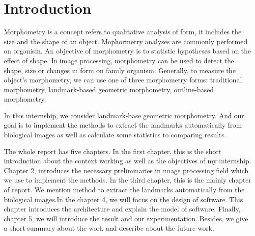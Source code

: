\chapter*{Introduction}
Morphometry is a concept refers to qualitative analysis of form, it includes the size and the shape of an object. Mophormetry analyses are commonly performed on organism. An objective of morphometry is to statistic hypotheses based on the effect of shape.
In image processing, morphometry can be used to detect the shape, size or changes in form on family organism. Generally, to measure the object's morphometry, we can use one of three morphometry forms: traditional morphometry, landmark-based geometric morphometry, outline-based morphometry.  

In this internship, we consider landmark-base geometric morphometry. And our goal is to implement the methods to extract the landmarks automatically from biological images as well as calculate some statistics to comparing results.

The whole report has five chapters. In the first chapter, this is the short introduction about the context working as well as the objectives of my internship. Chapter 2, introduces the necessary preliminaries in image processing field which we use to implement the methods. In the third chapter, this is the mainly chapter of report. We mention method to extract the landmarks automatically from the biological images.In the chapter 4, we will focus on the design of software. This chapter introduces the architecture and explain the model of software. Finally, chapter 5, we will introduce the result and our experimentation. Besides, we give a short summary about the work and describe about the future work.